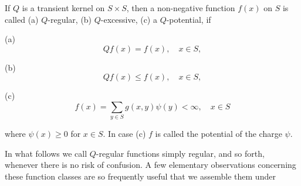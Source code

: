 If $Q$ is a transient kernel on $S \times S$, then a non-negative function $f(x)$ on $S$ is called (a) $Q$-regular, (b) $Q$-excessive, (c) a $Q$-potential, if

(a) $$Qf(x) = f(x), \quad x \in S,$$

(b) $$Qf(x) \leq f(x), \quad x \in S,$$

(c) $$f(x) = \sum_{y \in S} g(x,y)\psi(y) < \infty, \quad x \in S$$

where $\psi(x) \geq 0$ for $x \in S$. In case (c) $f$ is called the potential of the charge $\psi$.

In what follows we call $Q$-regular functions simply regular, and so forth, whenever there is no risk of confusion. A few elementary observations concerning these function classes are so frequently useful that we assemble them under